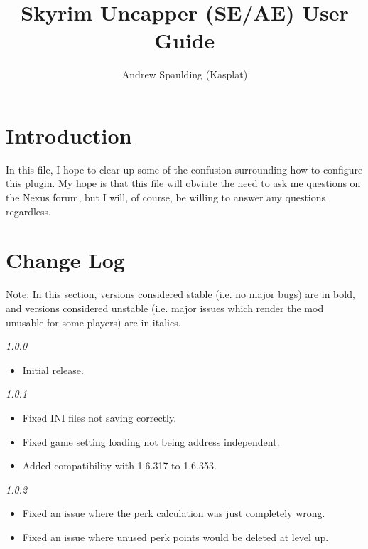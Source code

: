 \documentclass[12pt]{amsart}
\title{Skyrim Uncapper (SE/AE) User Guide}
\author{Andrew Spaulding (Kasplat)}
\begin{document}
\maketitle
\pagebreak

\newcommand{\startblock}{
    \noindent\begin{minipage}{\textwidth}\setlength{\parindent}{0.5in}\bigskip
}
\newcommand{\stopblock}{\end{minipage}}

\startblock
\section{Introduction}

In this file, I hope to clear up some of the confusion surrounding how to
configure this plugin. My hope is that this file will obviate the need
to ask me questions on the Nexus forum, but I will, of course, be willing
to answer any questions regardless.
\stopblock

\startblock
\section{Change Log}

Note: In this section, versions considered stable (i.e. no major bugs) are in
bold, and versions considered unstable (i.e. major issues which render the mod
unusable for some players) are in italics.

\bigskip
\noindent
\emph{1.0.0}
\begin{itemize}
    \item Initial release.
\end{itemize}
\stopblock

\startblock
\noindent
\emph{1.0.1}
\begin{itemize}
    \item Fixed INI files not saving correctly.
    \item Fixed game setting loading not being address independent.
    \item Added compatibility with 1.6.317 to 1.6.353.
\end{itemize}
\stopblock

\startblock
\noindent
\emph{1.0.2}
\begin{itemize}
    \item Fixed an issue where the perk calculation was just completely wrong.
    \item Fixed an issue where unused perk points would be deleted at level up.
\end{itemize}
\stopblock
\end{document}
